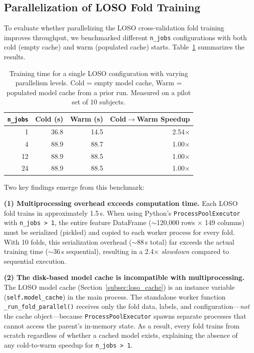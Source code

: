 \subsection{Parallelization of LOSO Fold Training}
\label{subsec:njobs_benchmark}

To evaluate whether parallelizing the LOSO cross-validation fold training improves throughput, we benchmarked different \texttt{n\_jobs} configurations with both cold (empty cache) and warm (populated cache) starts. Table~\ref{tab:njobs-benchmark} summarizes the results.

\begin{table}[h]
\centering
\caption{Training time for a single LOSO configuration with varying parallelism levels. Cold = empty model cache, Warm = populated model cache from a prior run. Measured on a pilot set of 10 subjects.}
\label{tab:njobs-benchmark}
\begin{tabular}{r r r r}
\toprule
\texttt{n\_jobs} & Cold (s) & Warm (s) & Cold$\rightarrow$Warm Speedup \\
\midrule
1  & 36.8 & 14.5 & 2.54$\times$ \\
4  & 88.9 & 88.7 & 1.00$\times$ \\
12 & 88.9 & 88.5 & 1.00$\times$ \\
24 & 88.9 & 88.5 & 1.00$\times$ \\
\bottomrule
\end{tabular}
\end{table}

Two key findings emerge from this benchmark:

\textbf{(1) Multiprocessing overhead exceeds computation time.}
Each LOSO fold trains in approximately 1.5\,s. When using Python's \texttt{ProcessPoolExecutor} with \texttt{n\_jobs > 1}, the entire feature DataFrame ($\sim$120{,}000 rows $\times$ 149 columns) must be serialized (pickled) and copied to each worker process for every fold. With 10 folds, this serialization overhead ($\sim$88\,s total) far exceeds the actual training time ($\sim$36\,s sequential), resulting in a 2.4$\times$ \emph{slowdown} compared to sequential execution.

\textbf{(2) The disk-based model cache is incompatible with multiprocessing.}
The LOSO model cache (Section~\ref{subsec:loso_cache}) is an instance variable (\texttt{self.model\_cache}) in the main process. The standalone worker function \texttt{\_run\_fold\_parallel()} receives only the fold data, labels, and configuration---\emph{not} the cache object---because \texttt{ProcessPoolExecutor} spawns separate processes that cannot access the parent's in-memory state. As a result, every fold trains from scratch regardless of whether a cached model exists, explaining the absence of any cold-to-warm speedup for \texttt{n\_jobs > 1}.

